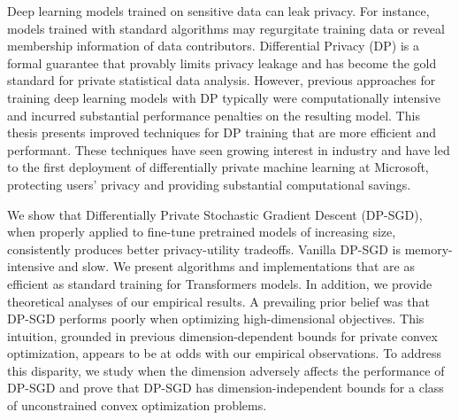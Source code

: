 
Deep learning models trained on sensitive data can leak privacy.
For instance, models trained with standard algorithms may regurgitate training data or reveal membership information of data contributors.
Differential Privacy (DP) is a formal guarantee that provably limits privacy leakage and has become the gold standard for private statistical data analysis.
However, previous approaches for training deep learning models with DP typically were computationally intensive and incurred substantial performance penalties on the resulting model.
This thesis presents improved techniques for DP training that are more efficient and performant.
These techniques have seen growing interest in industry and have led to the first deployment of differentially private machine learning at Microsoft, protecting users' privacy and providing substantial computational savings.

We show that Differentially Private Stochastic Gradient Descent (DP-SGD), when properly applied to fine-tune pretrained models of increasing size, consistently produces better privacy-utility tradeoffs. Vanilla DP-SGD is memory-intensive and slow. We present algorithms and implementations that are as efficient as standard training for Transformers models.
In addition, we provide theoretical analyses of our empirical results.
A prevailing prior belief was that DP-SGD performs poorly when optimizing high-dimensional objectives. 
This intuition, grounded in previous dimension-dependent bounds for private convex optimization, appears to be at odds with our empirical observations. 
To address this disparity, we study when the dimension adversely affects the performance of DP-SGD and prove that DP-SGD has dimension-independent bounds for a class of unconstrained convex optimization problems. 
